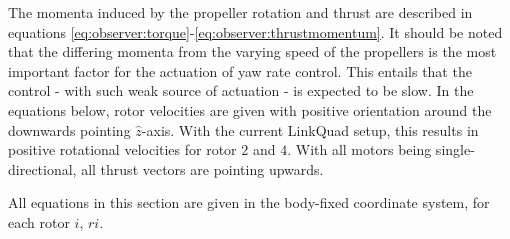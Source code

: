     The momenta induced by the propeller rotation and thrust
    are described in equations \eqref{eq:observer:torque}-\eqref{eq:observer:thrustmomentum}.
    It should be noted that the differing momenta from the varying speed of the
    propellers is the most important factor for the actuation of yaw rate control.
    This entails that the control - with such weak source of actuation - is expected to be slow.
    In the equations below, rotor velocities are given with positive orientation around the downwards
    pointing $\hat{z}$-axis. With the current LinkQuad setup, this results in positive rotational velocities for
    rotor $2$ and $4$. With all motors being single-directional, all thrust vectors are pointing upwards.

    All equations in this section are given in the body-fixed coordinate system, for each rotor $i$, \textit{$ri$}.

